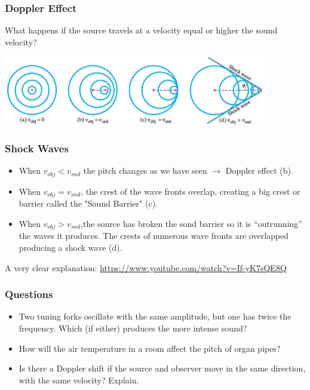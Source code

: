 \documentclass[]{beamer}
\begin{document}

\begin{frame}
\frametitle{Doppler Effect}

What happens if the source travels at a velocity equal or higher the sound velocity?

\pause


  \begin{center}
  \includegraphics[height=1.2in]{images4/shock_wave.jpg}
\end{center}






  \end{frame}



\begin{frame}
\frametitle{Shock Waves}

\begin{itemize}
\item When $v_{obj}<v_{snd}$ the pitch changes as we have seen $\rightarrow$ Doppler effect (b).
\pause
\item When  $v_{obj}=v_{snd}$, the crest of the wave fronts overlap, creating a big crest or barrier called the "Sound Barrier" (c).
\pause
\item When $v_{obj}>v_{snd}$,the source has broken the sond barrier so it  is  “outrunning” the waves it produces. The crests of numerous wave fronts are overlapped producing a shock wave (d). 
\end{itemize}

\pause

\vspace{3mm}

A very clear explanation: \url{https://www.youtube.com/watch?v=If-yK7sQE8Q}  


  \end{frame}



\begin{frame}
\frametitle{Questions}

\begin{itemize}
\item Two tuning forks oscillate with the same amplitude, but one
has twice the frequency. Which (if either) produces the more
intense sound?
\pause
\item How will the air temperature in a room affect the pitch of
organ pipes?
\pause
\item Is there a Doppler shift if the source and observer move in
the same direction, with the same velocity? Explain.
\end{itemize}

  \end{frame}
\end{document}

